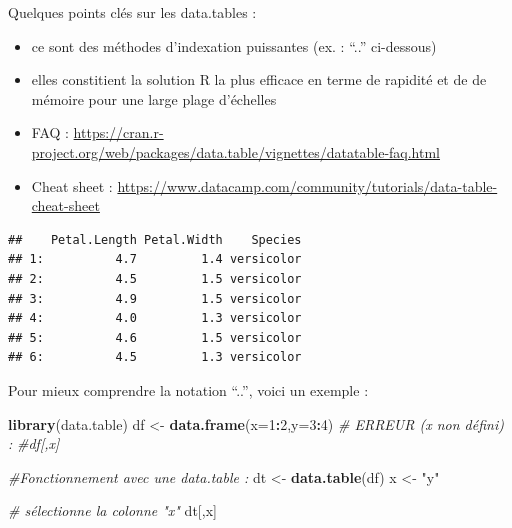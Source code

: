 \documentclass[
]{article}
\newenvironment{Shaded}{\begin{snugshade}}{\end{snugshade}}
\newcommand{\CommentTok}[1]{\textcolor[rgb]{0.56,0.35,0.01}{\textit{#1}}}
\newcommand{\DataTypeTok}[1]{\textcolor[rgb]{0.13,0.29,0.53}{#1}}
\newcommand{\DecValTok}[1]{\textcolor[rgb]{0.00,0.00,0.81}{#1}}
\newcommand{\KeywordTok}[1]{\textcolor[rgb]{0.13,0.29,0.53}{\textbf{#1}}}
\newcommand{\NormalTok}[1]{#1}
\newcommand{\OperatorTok}[1]{\textcolor[rgb]{0.81,0.36,0.00}{\textbf{#1}}}
\newcommand{\StringTok}[1]{\textcolor[rgb]{0.31,0.60,0.02}{#1}}
\providecommand{\tightlist}{%
  \setlength{\itemsep}{0pt}\setlength{\parskip}{0pt}}
\begin{document}
Quelques points clés sur les data.tables :

\begin{itemize}
\tightlist
\item
  ce sont des méthodes d'indexation puissantes (ex. : ``..'' ci-dessous)
\item
  elles constitient la solution R la plus efficace en terme de rapidité
  et de de mémoire pour une large plage d'échelles
\item
  FAQ :
  \url{https://cran.r-project.org/web/packages/data.table/vignettes/datatable-faq.html}
\item
  Cheat sheet :
  \url{https://www.datacamp.com/community/tutorials/data-table-cheat-sheet}
\end{itemize}

\begin{Shaded}
\end{Shaded}

\begin{verbatim}
##    Petal.Length Petal.Width    Species
## 1:          4.7         1.4 versicolor
## 2:          4.5         1.5 versicolor
## 3:          4.9         1.5 versicolor
## 4:          4.0         1.3 versicolor
## 5:          4.6         1.5 versicolor
## 6:          4.5         1.3 versicolor
\end{verbatim}

Pour mieux comprendre la notation ``..'', voici un exemple :

\begin{Shaded}
\begin{Highlighting}[]
\KeywordTok{library}\NormalTok{(data.table)}
\NormalTok{df <-}\StringTok{ }\KeywordTok{data.frame}\NormalTok{(}\DataTypeTok{x=}\DecValTok{1}\OperatorTok{:}\DecValTok{2}\NormalTok{,}\DataTypeTok{y=}\DecValTok{3}\OperatorTok{:}\DecValTok{4}\NormalTok{)}
\CommentTok{# ERREUR (x non défini) :}
\CommentTok{#df[,x]}

\CommentTok{#Fonctionnement avec une data.table :}
\NormalTok{dt <-}\StringTok{ }\KeywordTok{data.table}\NormalTok{(df)}
\NormalTok{x <-}\StringTok{ "y"}

\CommentTok{# sélectionne la colonne "x"}
\NormalTok{dt[,x]}
\end{Highlighting}
\end{Shaded}
\end{document}

